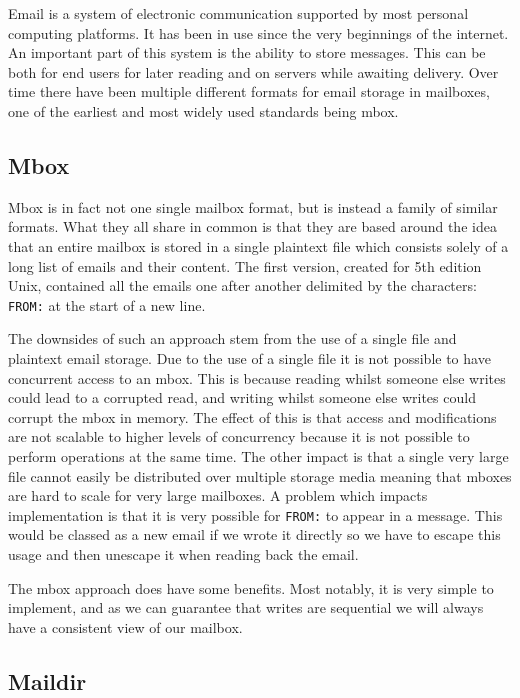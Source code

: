 \documentclass[12pt,a4paper,twoside,openright]{report}
\begin{document}
Email is a system of electronic communication supported by most personal computing platforms. It has been in use since the very beginnings of the internet. An important part of this system is the ability to store messages. This can be both for end users for later reading and on servers while awaiting delivery. Over time there have been multiple different formats for email storage in mailboxes, one of the earliest and most widely used standards being mbox.

\subsection{Mbox}

Mbox is in fact not one single mailbox format, but is instead a family of similar formats. What they all share in common is that they are based around the idea that an entire mailbox is stored in a single plaintext file which consists solely of a long list of emails and their content. The first version, created for 5th edition Unix, contained all the emails one after another delimited by the characters: \texttt{FROM:} at the start of a new line.

The downsides of such an approach stem from the use of a single file and plaintext email storage. Due to the use of a single file it is not possible to have concurrent access to an mbox. This is because reading whilst someone else writes could lead to a corrupted read, and writing whilst someone else writes could corrupt the mbox in memory. The effect of this is that access and modifications are not scalable to higher levels of concurrency because it is not possible to perform operations at the same time. The other impact is that a single very large file cannot easily be distributed over multiple storage media meaning that mboxes are hard to scale for very large mailboxes. A problem which impacts implementation is that it is very possible for \texttt{FROM:} to appear in a message. This would be classed as a new email if we wrote it directly so we have to escape this usage and then unescape it when reading back the email.

The mbox approach does have some benefits. Most notably, it is very simple to implement, and as we can guarantee that writes are sequential we will always have a consistent view of our mailbox.

\subsection{Maildir}
\end{document}
